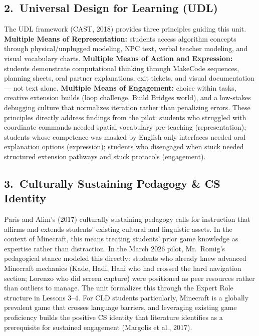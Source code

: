 \documentclass[12pt]{article}
\begin{document}
\subsection{2.\ Universal Design for Learning (UDL)}

The UDL framework (CAST, 2018) provides three principles guiding this unit. \textbf{Multiple Means of Representation:} students access algorithm concepts through physical/unplugged modeling, NPC text, verbal teacher modeling, and visual vocabulary charts. \textbf{Multiple Means of Action and Expression:} students demonstrate computational thinking through MakeCode sequences, planning sheets, oral partner explanations, exit tickets, and visual documentation --- not text alone. \textbf{Multiple Means of Engagement:} choice within tasks, creative extension builds (loop challenge, Build Bridges world), and a low-stakes debugging culture that normalizes iteration rather than penalizing errors. These principles directly address findings from the pilot: students who struggled with coordinate commands needed spatial vocabulary pre-teaching (representation); students whose competence was masked by English-only interfaces needed oral explanation options (expression); students who disengaged when stuck needed structured extension pathways and stuck protocols (engagement).

\subsection{3.\ Culturally Sustaining Pedagogy \& CS Identity}

Paris and Alim's (2017) culturally sustaining pedagogy calls for instruction that affirms and extends students' existing cultural and linguistic assets. In the context of Minecraft, this means treating students' prior game knowledge as expertise rather than distraction. In the March 2026 pilot, Mr.\ Romig's pedagogical stance modeled this directly: students who already knew advanced Minecraft mechanics (Kade, Hadi, Hani who had crossed the hard navigation section; Lorenzo who did screen capture) were positioned as peer resources rather than outliers to manage. The unit formalizes this through the Expert Role structure in Lessons 3--4. For CLD students particularly, Minecraft is a globally prevalent game that crosses language barriers, and leveraging existing game proficiency builds the positive CS identity that literature identifies as a prerequisite for sustained engagement (Margolis et al., 2017).
\end{document}
